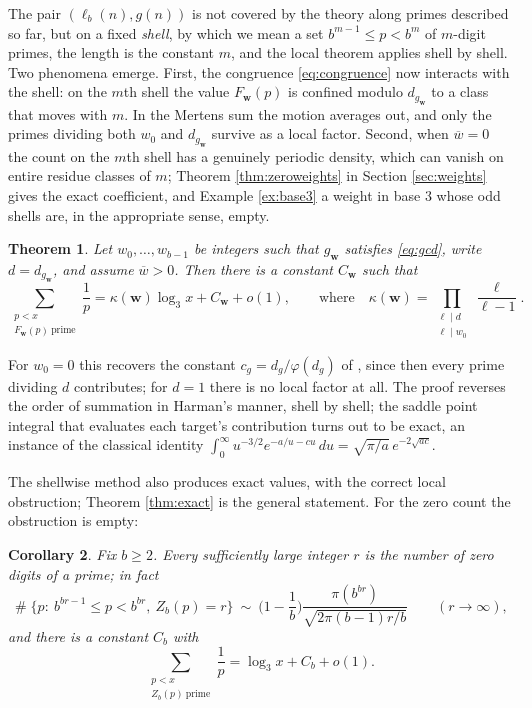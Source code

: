 \documentclass[11pt,reqno]{amsart}
\theoremstyle{plain}
\newtheorem{theorem}{Theorem}[section]
\newtheorem{corollary}[theorem]{Corollary}
\theoremstyle{definition}
\DeclareMathOperator{\Card}{\#}
\begin{document}
The pair $(\ell_b(n),g(n))$ is not covered by the theory along primes described so far, but on a fixed \emph{shell}, by which we mean a set $b^{m-1}\le p<b^m$ of $m$-digit primes, the length is the constant $m$, and the local theorem applies shell by shell. Two phenomena emerge. First, the congruence \eqref{eq:congruence} now interacts with the shell: on the $m$th shell the value $F_{\mathbf w}(p)$ is confined modulo $d_{g_{\mathbf w}}$ to a class that moves with $m$. In the Mertens sum the motion averages out, and only the primes dividing both $w_0$ and $d_{g_{\mathbf w}}$ survive as a local factor. Second, when $\overline w=0$ the count on the $m$th shell has a genuinely periodic density, which can vanish on entire residue classes of $m$; Theorem \ref{thm:zeroweights} in Section \ref{sec:weights} gives the exact coefficient, and Example \ref{ex:base3} a weight in base $3$ whose odd shells are, in the appropriate sense, empty.

\begin{theorem}\label{thm:weights}
Let $w_0,\dots,w_{b-1}$ be integers such that $g_{\mathbf w}$ satisfies \eqref{eq:gcd}, write $d=d_{g_{\mathbf w}}$, and assume $\overline w>0$. Then there is a constant $C_{\mathbf w}$ such that
\[
\sum_{\substack{p<x\\ F_{\mathbf w}(p)\ \text{prime}}}\frac1p
=\kappa(\mathbf w)\log_3x+C_{\mathbf w}+o(1),
\qquad\text{where}\quad
\kappa(\mathbf w)=\prod_{\substack{\ell\mid d\\ \ell\mid w_0}}\frac{\ell}{\ell-1}.
\]
\end{theorem}

For $w_0=0$ this recovers the constant $c_g=d_g/\varphi(d_g)$ of \cite{vibefrtz}, since then every prime dividing $d$ contributes; for $d=1$ there is no local factor at all. The proof reverses the order of summation in Harman's manner, shell by shell; the saddle point integral that evaluates each target's contribution turns out to be exact, an instance of the classical identity $\int_0^\infty u^{-3/2}e^{-a/u-cu}\,du=\sqrt{\pi/a}\,e^{-2\sqrt{ac}}$.

The shellwise method also produces exact values, with the correct local obstruction; Theorem \ref{thm:exact} is the general statement. For the zero count the obstruction is empty:

\begin{corollary}\label{cor:zeros}
Fix $b\ge2$. Every sufficiently large integer $r$ is the number of zero digits of a prime; in fact
\[
\Card\{p:\ b^{br-1}\le p<b^{br},\ Z_b(p)=r\}
\ \sim\ \Big(1-\frac1b\Big)\frac{\pi(b^{br})}{\sqrt{2\pi(b-1)r/b}}
\qquad(r\to\infty),
\]
and there is a constant $C_b$ with
\[
\sum_{\substack{p<x\\ Z_b(p)\ \text{prime}}}\frac1p=\log_3x+C_b+o(1).
\]
\end{corollary}
\end{document}
